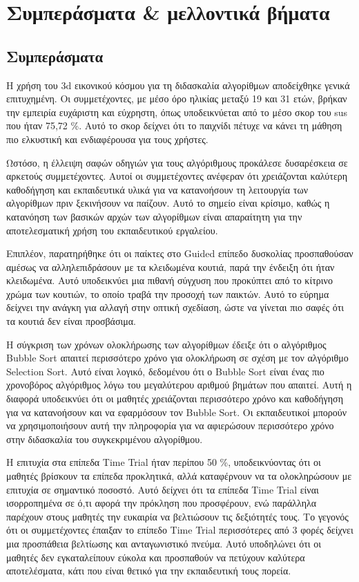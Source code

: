 \hideheader
\section{Συμπεράσματα \& μελλοντικά βήματα}

\subsection{Συμπεράσματα}

Η χρήση του \acrshort{3d} εικονικού κόσμου για τη διδασκαλία αλγορίθμων αποδείχθηκε γενικά επιτυχημένη. Οι συμμετέχοντες, με μέσο όρο ηλικίας μεταξύ 19 και 31 ετών, βρήκαν την εμπειρία ευχάριστη και εύχρηστη, όπως υποδεικνύεται από το μέσο σκορ του \acrshort{sus} που ήταν 75,72 \%. Αυτό το σκορ δείχνει ότι το παιχνίδι πέτυχε να κάνει τη μάθηση πιο ελκυστική και ενδιαφέρουσα για τους χρήστες.

Ωστόσο, η έλλειψη σαφών οδηγιών για τους αλγόριθμους προκάλεσε δυσαρέσκεια σε αρκετούς συμμετέχοντες. Αυτοί οι συμμετέχοντες ανέφεραν ότι χρειάζονται καλύτερη καθοδήγηση και εκπαιδευτικά υλικά για να κατανοήσουν τη λειτουργία των αλγορίθμων πριν ξεκινήσουν να παίζουν. Αυτό το σημείο είναι κρίσιμο, καθώς η κατανόηση των βασικών αρχών των αλγορίθμων είναι απαραίτητη για την αποτελεσματική χρήση του εκπαιδευτικού εργαλείου.

Επιπλέον, παρατηρήθηκε ότι οι παίκτες στο Guided επίπεδο δυσκολίας προσπαθούσαν αμέσως να αλληλεπιδράσουν με τα κλειδωμένα κουτιά, παρά την ένδειξη ότι ήταν κλειδωμένα. Αυτό υποδεικνύει μια πιθανή σύγχυση που προκύπτει από το κίτρινο χρώμα των κουτιών, το οποίο τραβά την προσοχή των παικτών. Αυτό το εύρημα δείχνει την ανάγκη για αλλαγή στην οπτική σχεδίαση, ώστε να γίνεται πιο σαφές ότι τα κουτιά δεν είναι προσβάσιμα.

Η σύγκριση των χρόνων ολοκλήρωσης των αλγορίθμων έδειξε ότι ο αλγόριθμος Bubble Sort απαιτεί περισσότερο χρόνο για ολοκλήρωση σε σχέση με τον αλγόριθμο Selection Sort. Αυτό είναι λογικό, δεδομένου ότι ο Bubble Sort είναι ένας πιο χρονοβόρος αλγόριθμος λόγω του μεγαλύτερου αριθμού βημάτων που απαιτεί. Αυτή η διαφορά υποδεικνύει ότι οι μαθητές χρειάζονται περισσότερο χρόνο και καθοδήγηση για να κατανοήσουν και να εφαρμόσουν τον Bubble Sort. Οι εκπαιδευτικοί μπορούν να χρησιμοποιήσουν αυτή την πληροφορία για να αφιερώσουν περισσότερο χρόνο στην διδασκαλία του συγκεκριμένου αλγορίθμου.

Η επιτυχία στα επίπεδα Time Trial ήταν περίπου 50 \%, υποδεικνύοντας ότι οι μαθητές βρίσκουν τα επίπεδα προκλητικά, αλλά καταφέρνουν να τα ολοκληρώσουν με επιτυχία σε σημαντικό ποσοστό. Αυτό δείχνει ότι τα επίπεδα Time Trial είναι ισορροπημένα σε ό,τι αφορά την πρόκληση που προσφέρουν, ενώ παράλληλα παρέχουν στους μαθητές την ευκαιρία να βελτιώσουν τις δεξιότητές τους. Το γεγονός ότι οι συμμετέχοντες έπαιξαν το επίπεδο Time Trial περισσότερες από 3 φορές δείχνει μια προσπάθεια βελτίωσης και ανταγωνιστικό πνεύμα. Αυτό υποδηλώνει ότι οι μαθητές δεν εγκαταλείπουν εύκολα και προσπαθούν να πετύχουν καλύτερα αποτελέσματα, κάτι που είναι θετικό για την εκπαιδευτική τους πορεία.

